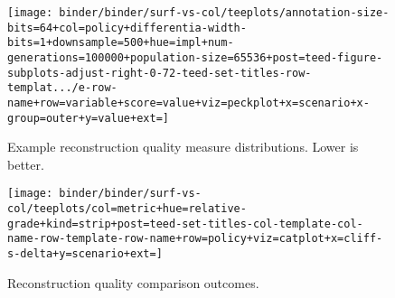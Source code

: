 \begin{figure*}
  \centering
  \begin{subfigure}[b]{0.5\textwidth}
    \centering
    \texttt{[image: binder/binder/surf-vs-col/teeplots/annotation-size-bits=64+col=policy+differentia-width-bits=1+downsample=500+hue=impl+num-generations=100000+population-size=65536+post=teed-figure-subplots-adjust-right-0-72-teed-set-titles-row-templat.../e-row-name+row=variable+score=value+viz=peckplot+x=scenario+x-group=outer+y=value+ext=]}
    \caption{Example reconstruction quality measure distributions. Lower is better.}
    \label{fig:col-vs-surf-example}
  \end{subfigure}%
  \begin{subfigure}[b]{0.5\textwidth}
    \centering
    \texttt{[image: binder/binder/surf-vs-col/teeplots/col=metric+hue=relative-grade+kind=strip+post=teed-set-titles-col-template-col-name-row-template-row-name+row=policy+viz=catplot+x=cliff-s-delta+y=scenario+ext=]}
    \caption{Reconstruction quality comparison outcomes.}
  \label{fig:col-vs-surf-overview}
  \end{subfigure}
  \caption{%
    \textbf{Does column- or surface-based instrumentation give higher-quality reconstruction?}
    Subpanel \ref{fig:col-vs-surf-overview} shows effect sizes of column-vs-surface comparisons for triplet distance and inner node loss metrics.
    Color coding indicates a significant outcome (Mann-Whitney U).
    Surface tends to outperform column under tilted policy and vice versa under steady policy.
    Subpanel \ref{fig:col-vs-surf-example} shows reconstruction quality effects for 64-bit size, bit-differentia annotations wit population size 65,536, downsample size 500, and 100k generations.
    Background hatching indicates significant outcome.
  }
  \label{fig:col-vs-surf-summary}
\end{figure*}
